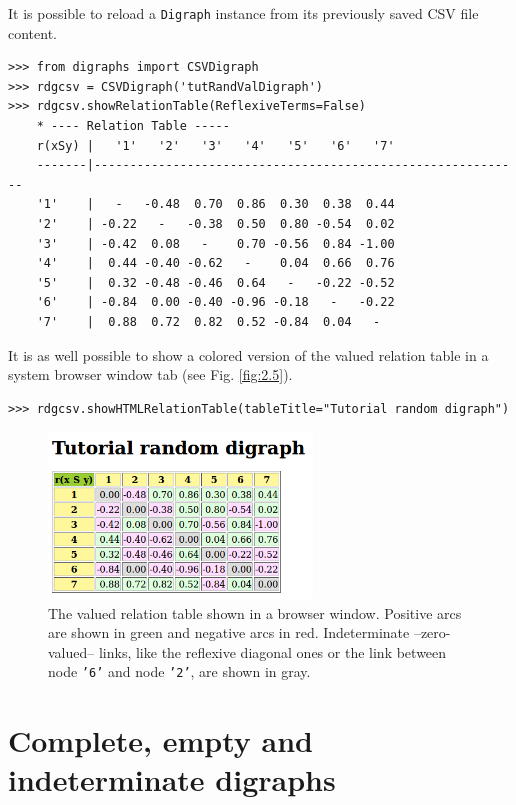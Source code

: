 It is possible to reload a \texttt{Digraph} instance from its previously saved CSV file content.
\begin{lstlisting} 
>>> from digraphs import CSVDigraph   
>>> rdgcsv = CSVDigraph('tutRandValDigraph')
>>> rdgcsv.showRelationTable(ReflexiveTerms=False)
    * ---- Relation Table -----
    r(xSy) |   '1'   '2'   '3'   '4'   '5'   '6'   '7'	  
    -------|------------------------------------------------------------
    '1'    |   -   -0.48  0.70  0.86  0.30  0.38  0.44	 
    '2'    | -0.22   -   -0.38  0.50  0.80 -0.54  0.02	 
    '3'    | -0.42  0.08   -    0.70 -0.56  0.84 -1.00	 
    '4'    |  0.44 -0.40 -0.62   -    0.04  0.66  0.76	 
    '5'    |  0.32 -0.48 -0.46  0.64   -   -0.22 -0.52	 
    '6'    | -0.84  0.00 -0.40 -0.96 -0.18   -   -0.22	 
    '7'    |  0.88  0.72  0.82  0.52 -0.84  0.04   -
\end{lstlisting}
  
It is as well possible to show a colored version of the valued relation table in a system browser window tab (see Fig. \ref{fig:2.5}).
\begin{lstlisting}
>>> rdgcsv.showHTMLRelationTable(tableTitle="Tutorial random digraph")
\end{lstlisting}
 \begin{figure}[h]
\sidecaption[t]
\includegraphics[width=7cm]{Figures/htmlTutorialDigraph.png}
\caption{The valued relation table shown in a browser window. Positive arcs are shown in green and negative arcs in red. Indeterminate --zero-valued-- links, like the reflexive diagonal ones or the link between node \texttt{'6'} and node \texttt{'2'}, are shown in gray.}
\label{fig:2.6}       %
\end{figure}
 
\section{Complete, empty and indeterminate digraphs}
\label{sec:2.10}

